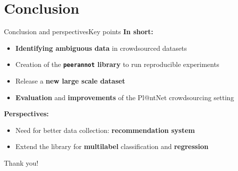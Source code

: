 \section{Conclusion}

\begin{frame}{Conclusion and perspectives}{Key points}
\textbf{In short:}
\begin{itemize}
    \item \textbf{Identifying ambiguous data} in crowdsourced datasets
    \item Creation of the \textbf{\texttt{peerannot} library} to run reproducible experiments
    \item Release a \textbf{new large scale dataset}
    \item \textbf{Evaluation} and \textbf{improvements} of the Pl@ntNet crowdsourcing setting
\end{itemize}
    \pause
    \vspace{1cm}
\textbf{Perspectives:}
    \begin{itemize}
        \item Need for better data collection: \textbf{recommendation system}
        \item Extend the library for \textbf{multilabel} classification and \textbf{regression}
    \end{itemize}
    \pause
    \begin{flushright}
        Thank you!
    \end{flushright}
\end{frame}
